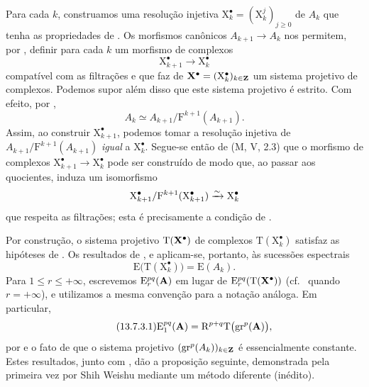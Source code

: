 \begin{env}[13.7.2]
\label{0.13.7.2}
Para cada $k$, construamos uma resolução injetiva
$\mathrm{X}_k^\bullet=(\mathrm{X}_k^j)_{j\geq0}$ de $A_k$ que tenha as
propriedades de .
Os morfismos canônicos $A_{k+1}\longrightarrow A_k$ nos permitem, por
, definir para cada $k$ um morfismo de complexos
\[
  \mathrm{X}_{k+1}^\bullet\longrightarrow\mathrm{X}_k^\bullet
\]
compatível com as filtrações e que faz de
$\mathbf{X}^\bullet=(\mathrm{X}_k^\bullet)_{k\in\mathbf{Z}}$ um sistema
projetivo de complexos.
Podemos supor além disso que este sistema projetivo é estrito.
Com efeito, por ,
\[
  A_k
  \simeq
  A_{k+1}/\mathrm{F}^{k+1}(A_{k+1}).
\]
Assim, ao construir $\mathrm{X}_{k+1}^\bullet$, podemos tomar a
resolução injetiva de
$A_{k+1}/\mathrm{F}^{k+1}(A_{k+1})$ \emph{igual} a
$\mathrm{X}_k^\bullet$.
Segue-se então de (M, V, 2.3) que o morfismo de complexos
$\mathrm{X}_{k+1}^\bullet\longrightarrow\mathrm{X}_k^\bullet$ pode
ser construído de modo que, ao passar aos quocientes, induza um
isomorfismo
\[
  \mathrm{X}_{k+1}^\bullet/
  \mathrm{F}^{k+1}(\mathrm{X}_{k+1}^\bullet)
  \xrightarrow{\sim}
  \mathrm{X}_k^\bullet
\]
que respeita as filtrações; esta é precisamente a condição de
.
\end{env}

\begin{env}[13.7.3]
\label{0.13.7.3}
Por construção, o sistema projetivo
$\mathrm{T}(\mathbf{X}^\bullet)$ de complexos
$\mathrm{T}(\mathrm{X}_k^\bullet)$ satisfaz as hipóteses de
.
Os resultados de ,  e
 aplicam-se, portanto, às sucessões espectrais
\[
  \mathrm{E}\bigl(\mathrm{T}(\mathrm{X}_k^\bullet)\bigr)
  =
  \mathrm{E}(A_k).
\]
Para $1\leq r\leq+\infty$, escrevemos
$\mathrm{E}_r^{pq}(\mathbf{A})$ em lugar de
$\mathrm{E}_r^{pq}(\mathrm{T}(\mathbf{X}^\bullet))$
(cf.\  quando $r=+\infty$), e utilizamos a mesma convenção
para a notação análoga.
Em particular,
\begin{equation}
\label{0.13.7.3.1}
\tag{13.7.3.1}
  \mathrm{E}_1^{pq}(\bb{A})
  =
  \RR^{p+q}\mathrm{T}\bigl(\mathrm{gr}^p(\bb{A})\bigr),
\end{equation}
por  e o fato de que o sistema projetivo
$(\mathrm{gr}^p(A_k))_{k\in\mathbf{Z}}$ é essencialmente constante.
Estes resultados, junto com , dão a proposição
seguinte, demonstrada pela primeira vez por Shih Weishu mediante um método
diferente (inédito).
\end{env}

